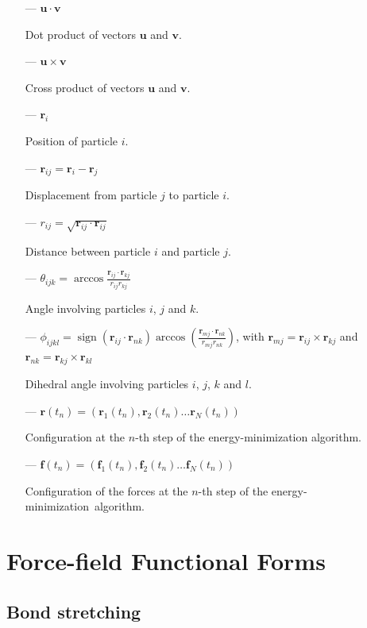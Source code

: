\documentclass[10pt,a4paper,openany]{memoir}
\numberwithin{equation}{section}
\DeclareMathOperator{\sign}{sign}
\newcommand{\rsub}[1]{\mathbf{r}_{#1}}
\newcommand{\fsub}[1]{\mathbf{f}_{#1}}
\begin{document}
\begin{itemize}
\item[---] $\mathbf{u} \cdot \mathbf{v}$ \par  Dot product of vectors $\mathbf{u}$ and $\mathbf{v}$.
\item[---] $\mathbf{u} \times \mathbf{v}$ \par  Cross product of vectors $\mathbf{u}$ and $\mathbf{v}$.
\item[---] $\mathbf{r}_i$ \par  Position of particle $i$.
\item[---] $\mathbf{r}_{ij} = \mathbf{r}_i - \mathbf{r}_j$ \par  Displacement from particle $j$ to particle $i$.
\item[---] $r_{ij} = \sqrt{\mathbf{r}_{ij} \cdot \mathbf{r}_{ij}}$ \par  Distance between particle $i$ and particle $j$.
\item[---] $\theta_{ijk} = \arccos{\frac{\mathbf{r}_{ij} \cdot \mathbf{r}_{kj}}{r_{ij}r_{kj}}}$  \par  Angle involving particles $i$, $j$ and $k$.
\item[---] $\phi_{ijkl} = \sign{(\rsub{ij} \cdot \rsub{nk})} \arccos{\left( \frac{\rsub{mj} \cdot \rsub{nk}}{r_{mj}r_{nk}} \right)}$, with $\rsub{mj} = \rsub{ij}\times\rsub{kj}$ and $\rsub{nk} = \rsub{kj}\times\rsub{kl}$
  \par  Dihedral angle involving particles $i$, $j$, $k$ and $l$.
\item[---] $\mathbf{r}(t_n) = (\rsub{1}(t_n),\rsub{2}(t_n)\ldots\rsub{N}(t_n))$
  \par
  
  Configuration at the $n$-th step of the energy-minimization algorithm.
\item[---] $\mathbf{f}(t_n) = (\fsub{1}(t_n),\fsub{2}(t_n)\ldots\fsub{N}(t_n))$
  \par
  Configuration of the forces at the $n$-th step of the energy-minimization~algorithm.
\end{itemize}

\section{Force-field Functional Forms}
\label{sec:mm-force-field-functional-forms}


\subsection{Bond stretching}
\label{sec:bond-terms}
\end{document}
